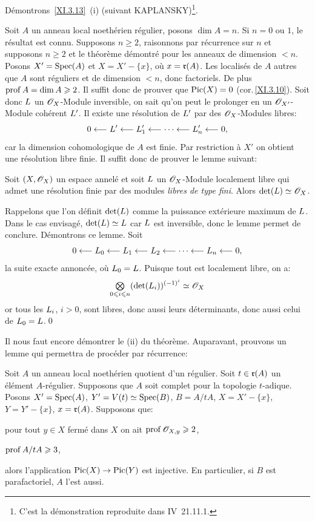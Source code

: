 D\'emontrons~\ref{XI.3.13}~(i) (suivant KAPLANSKY)\footnote{C'est la d\'emonstration reproduite dans \EGA IV~21.11.1.}.

Soit $A$ un anneau local noeth\'erien r\'egulier, posons $\dim A=n$. Si $n=0$ ou $1$, le r\'esultat est connu. Supposons $n\geq 2$, raisonnons par r\'ecurrence sur $n$ et supposons $n\geq 2$ et le th\'eor\`eme d\'emontr\'e pour les anneaux de dimension $<n$. Posons $X'=\operatorname{Spec}(A)$ et $X=X'-\{x\}$, o\`u $x=\mathfrak{r}(A)$. Les localis\'es de $A$ autres que $A$ sont r\'eguliers et de dimension $<n$, donc factoriels. De plus $\operatorname{prof} A = \dim A\geqslant 2$. Il suffit donc de prouver que $\operatorname{Pic}(X)=0$ (cor.\,\ref{XI.3.10}). Soit donc ${L}$ un $\mathscr{O}_X$-Module inversible, on sait qu'on peut le prolonger en un ${\mathscr O}_{X'}$-Module coh\'erent ${L}'$. Il existe une r\'esolution de ${L}'$ par des $\mathscr{O}_X$-Modules libres:
\[
0\from {\Lcal}'\from {\Lcal}'_1\from\cdots\from{\Lcal}'_n\from 0{\quoi},
\]
car la dimension cohomologique de $A$ est finie. Par restriction \`a $X'$ on obtient une r\'esolution libre finie. Il suffit donc de prouver le lemme suivant:

\begin{lemme} \label{XI.3.15} Soit $(X, \mathscr{O}_X)$ un espace annel\'e et soit ${L}$ un $\mathscr{O}_X$-Module localement libre qui admet une r\'esolution finie par des modules \emph{libres de type fini}. Alors $\det({L}) \simeq \mathscr{O}_X$.
\end{lemme}

Rappelons que l'on d\'efinit $\det({L})$ comme la puissance ext\'erieure maximum de ${L}$. Dans le cas envisag\'e, $\det({L}) \simeq{L}$ car ${L}$ est inversible, donc le lemme permet de conclure. D\'emontrons ce lemme. Soit
\[
0\from {\Lcal}_0\from {\Lcal}_1\from {\Lcal}_2\from\cdots\from{\Lcal}_n\from 0{\quoi},
\]
la suite exacte annonc\'ee, o\`u ${L}_0={L}$. Puisque tout est localement libre, on a:
\[
\mathop{\textstyle\bigotimes}\limits_{0\leqslant i\leqslant n}(\det({L}_i))^{(-1)^i} \simeq \mathscr{O}_X
\]
or tous les ${L}_i$, $i>0$, sont libres, donc aussi leurs d\'eterminants, donc aussi celui de ${L}_0 = {L}$.\qed

\medskip
Il nous faut encore d\'emontrer le (ii) du th\'eor\`eme. Auparavant, prouvons un lemme qui permettra de proc\'eder par r\'ecurrence:

\begin{lemme} \label{XI.3.16}
Soit $A$ un anneau local noeth\'erien quotient d'un r\'egulier. Soit $t\in\mathfrak{r}(A)$ un \'el\'ement $A$-r\'egulier. Supposons que $A$ soit complet pour la topologie $t$-adique. Posons $X'=\operatorname{Spec}(A)$, $Y'=V(t)\simeq \operatorname{Spec}(B)$, $B=A/tA$, $X=X'-\{x\}$, $Y=Y'-\{x\}$, $x=\mathfrak{r}(A)$. Supposons que:
\begin{enumeratea}
\item
pour tout $y\in X$ ferm\'e dans $X$ on ait $\operatorname{prof}{\mathscr O}_{X, y}\geqslant 2$,
\item
$\operatorname{prof} A/tA\geqslant 3$,
\end{enumeratea}
\noindent
alors l'application $\Pic(X)\to\Pic(Y)$ est injective. En particulier, si $B$ est parafactoriel, $A$ l'est aussi.
\end{lemme}

